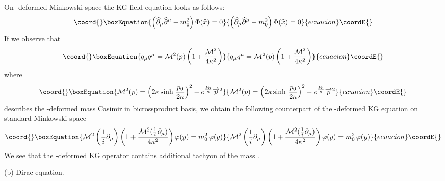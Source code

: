 \documentclass[a4paper,a4paper]{article}
\begin{document}
On \myHighlight{$\kappa$}\coordHE{}-deformed Minkowski space the KG   field equation
looks as follows:
\begin{equation}\coord{}\boxEquation{\label{luma35}  
  \left( \widehat{\partial}_{\mu} \widehat{\partial}^{\mu} -
  m^{2}_{0} \right)
  \Phi( \widehat{x}) = 0
}{\left( \widehat{\partial}_{\mu} \widehat{\partial}^{\mu} -
  m^{2}_{0} \right)
  \Phi( \widehat{x}) = 0
}{ecuacion}\coordE{}\end{equation}
If we observe that
\begin{equation}\coord{}\boxEquation{\label{luma36} 
  q_{\mu}q^{\mu} = {\cal M}^{2} (p)
   \left(
   1 + {{\cal  M}^{2} \over 4 \kappa^{2}} \right)
}{q_{\mu}q^{\mu} = {\cal M}^{2} (p)
   \left(
   1 + {{\cal  M}^{2} \over 4 \kappa^{2}} \right)
}{ecuacion}\coordE{}\end{equation}
where
\begin{equation}\coord{}\boxEquation{\label{luma37} 
  {\cal M}^{2} (p) =
  \left( 2 \kappa  \sinh \, {p_{0} \over 2 \kappa }\right)^{2} -
  e^{{P_{0}\over \kappa}} \overrightarrow{p}^{2}
}{{\cal M}^{2} (p) =
  \left( 2 \kappa  \sinh \, {p_{0} \over 2 \kappa }\right)^{2} -
  e^{{P_{0}\over \kappa}} \overrightarrow{p}^{2}
}{ecuacion}\coordE{}\end{equation}
describes the \myHighlight{$\kappa$}\coordHE{}-deformed mass Casimir in bicrossproduct
basis, we obtain  the following counterpart of the
\myHighlight{$\kappa$}\coordHE{}-deformed KG equation  on standard Minkowski space
\begin{equation}\coord{}\boxEquation{\label{luma38}      
  {\cal M}^{2} \left( {1\over i} \partial_{\mu} \right)
  \left( 1 + { {\cal M}^{2}( {1\over i} \partial_{\mu} )\over
  4\kappa^{2}} \right) \varphi(y) = m^{2}_{0} \, \varphi(y)
}{{\cal M}^{2} \left( {1\over i} \partial_{\mu} \right)
  \left( 1 + { {\cal M}^{2}( {1\over i} \partial_{\mu} )\over
  4\kappa^{2}} \right) \varphi(y) = m^{2}_{0} \, \varphi(y)
}{ecuacion}\coordE{}\end{equation}
We see that the \myHighlight{$\kappa$}\coordHE{}-deformed KG operator
     contains additional
tachyon of the mass  \coordHE{}.

(b) Dirac equation.
\end{document}
